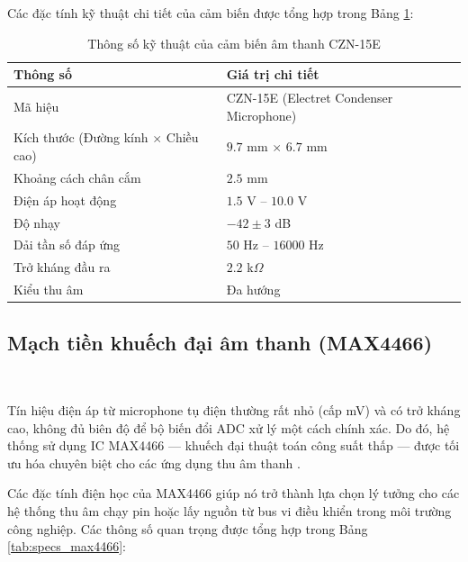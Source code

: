 \documentclass[a4paper]{report}
\begin{document}
Các đặc tính kỹ thuật chi tiết của cảm biến được tổng hợp trong Bảng \ref{tab:specs_mic}\cite{czn15e_datasheet}:

\begin{table}[H]
   \centering
   \caption{Thông số kỹ thuật của cảm biến âm thanh CZN-15E}
   \label{tab:specs_mic}
   \begin{tabular}{|l|l|}
      \hline
      \textbf{Thông số} & \textbf{Giá trị chi tiết} \\ \hline
      Mã hiệu & CZN-15E (Electret Condenser Microphone) \\ \hline
      Kích thước (Đường kính $\times$ Chiều cao) & $\num{9.7}$ mm $\times$ $\num{6.7}$ mm \\ \hline
      Khoảng cách chân cắm & $\num{2.5}$ mm \\ \hline
      Điện áp hoạt động & $\num{1.5}$ V -- $\num{10.0}$ V \\ \hline
      Độ nhạy & $-42 \pm 3$ dB \\ \hline
      Dải tần số đáp ứng & $\num{50}$ Hz -- $\num{16000}$ Hz \\ \hline
      Trở kháng đầu ra & $\num{2.2}$ k$\Omega$ \\ \hline
      Kiểu thu âm & Đa hướng \\ \hline
   \end{tabular}
\end{table}

\subsection{Mạch tiền khuếch đại âm thanh (MAX4466)}

\ 

Tín hiệu điện áp từ microphone tụ điện thường rất nhỏ (cấp mV) và có trở kháng cao, không đủ biên độ để bộ biến đổi ADC xử lý một cách chính xác. Do đó, hệ thống sử dụng IC MAX4466 --- khuếch đại thuật toán công suất thấp --- được tối ưu hóa chuyên biệt cho các ứng dụng thu âm thanh \cite{max4466_datasheet}.

Các đặc tính điện học của MAX4466 giúp nó trở thành lựa chọn lý tưởng cho các hệ thống thu âm chạy pin hoặc lấy nguồn từ bus vi điều khiển trong môi trường công nghiệp. Các thông số quan trọng được tổng hợp trong Bảng \ref{tab:specs_max4466}:
\end{document}
